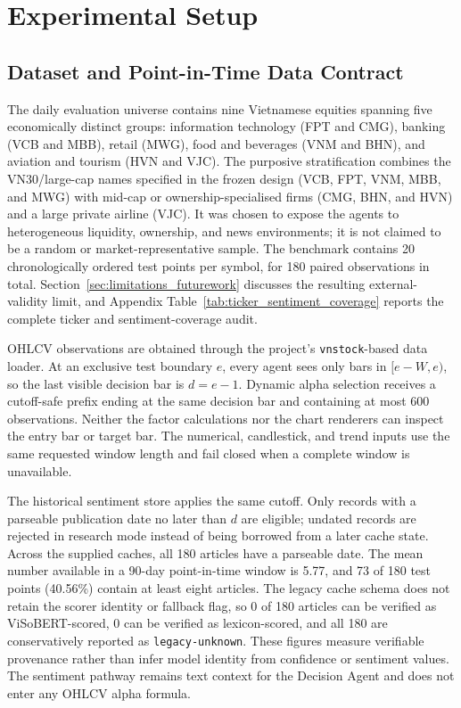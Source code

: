 \section{Experimental Setup}
\label{sec:experimentalsetup}

\subsection{Dataset and Point-in-Time Data Contract}

The daily evaluation universe contains nine Vietnamese equities spanning five economically distinct groups: information technology (FPT and CMG), banking (VCB and MBB), retail (MWG), food and beverages (VNM and BHN), and aviation and tourism (HVN and VJC). The purposive stratification combines the VN30/large-cap names specified in the frozen design (VCB, FPT, VNM, MBB, and MWG) with mid-cap or ownership-specialised firms (CMG, BHN, and HVN) and a large private airline (VJC). It was chosen to expose the agents to heterogeneous liquidity, ownership, and news environments; it is not claimed to be a random or market-representative sample. The benchmark contains 20 chronologically ordered test points per symbol, for 180 paired observations in total. Section~\ref{sec:limitations_futurework} discusses the resulting external-validity limit, and Appendix Table~\ref{tab:ticker_sentiment_coverage} reports the complete ticker and sentiment-coverage audit.

OHLCV observations are obtained through the project's \texttt{vnstock}-based data loader. At an exclusive test boundary $e$, every agent sees only bars in $[e-W,e)$, so the last visible decision bar is $d=e-1$. Dynamic alpha selection receives a cutoff-safe prefix ending at the same decision bar and containing at most 600 observations. Neither the factor calculations nor the chart renderers can inspect the entry bar or target bar. The numerical, candlestick, and trend inputs use the same requested window length and fail closed when a complete window is unavailable.

The historical sentiment store applies the same cutoff. Only records with a parseable publication date no later than $d$ are eligible; undated records are rejected in research mode instead of being borrowed from a later cache state. Across the supplied caches, all 180 articles have a parseable date. The mean number available in a 90-day point-in-time window is 5.77, and 73 of 180 test points (40.56\%) contain at least eight articles. The legacy cache schema does not retain the scorer identity or fallback flag, so 0 of 180 articles can be verified as ViSoBERT-scored, 0 can be verified as lexicon-scored, and all 180 are conservatively reported as \texttt{legacy-unknown}. These figures measure verifiable provenance rather than infer model identity from confidence or sentiment values. The sentiment pathway remains text context for the Decision Agent and does not enter any OHLCV alpha formula.


